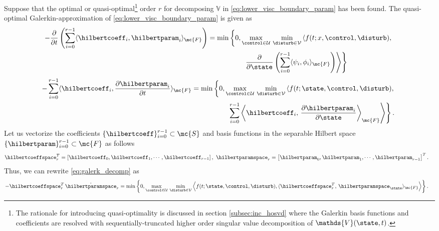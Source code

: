 Suppose that the optimal or quasi-optimal\footnote{The rationale for introducing quasi-optimality is discussed in section \ref{subsec:inc_hosvd} where the Galerkin basis functions and coefficients are resolved with sequentially-truncated higher order singular value decomposition of $\mathds{V}(\state, t)$.} order $r$ for decomposing $\mathds{V}$ in \eqref{eq:lower_visc_boundary_param} has been found.
%
The quasi-optimal Galerkin-approximation of \eqref{eq:lower_visc_boundary_param} is given as
%
	\begin{align}
		\begin{split}
		-\frac{\partial}{\partial t}\left(\sum_{i=0}^{r-1} \langle \hilbertcoeff_i,  \hilbertparam_i \rangle_{\mc{F}} \right) &= 
		\min \left\{0,  
			\max_{\control \in \mathcal{U}} \, \min_{\disturb \in \mathcal{V}} \left\langle f(t; x, \control, \disturb), \right. \right. \\
		 & \qquad \qquad \quad \left. \left. \dfrac{\partial }{\partial \state}\left(\sum_{i=0}^{r-1} \langle \psi_i, \phi_i\rangle_{\mc{F}} \right) \right\rangle \right\} 
		 \end{split}
		\end{align}
	\begin{align}
		\begin{split}
			-\sum_{i=0}^{r-1} \langle \hilbertcoeff_i, \dfrac{\partial \hilbertparam_i}{\partial t} \rangle_{\mc{F}}	&= \min \left\{0,  
			\max_{\control \in \mathcal{U}} \, \min_{\disturb \in \mathcal{V}} \left\langle f(t; \state, \control, \disturb), \right. \right. \\
			& \qquad \qquad \quad \left. \left. \sum_{i=0}^{r-1} \left\langle \hilbertcoeff_i, \, \dfrac{\partial \hilbertparam_i}{\partial \state} \right\rangle_{\mc{F}} \right\rangle \right\}.
		\end{split}
	\label{eq:galerk_decomp}
	\end{align}
%
Let us vectorize the coefficients $\{\hilbertcoeff\}_{i=0}^{r-1} \subset \mc{S}$ and basis functions in the separable Hilbert space $\{\hilbertparam\}_{i=0}^{r-1} \subset \mc{F}$ as follows 
	\begin{align}
		\hilbertcoeffspace_r^T &= \left[\hilbertcoeff_0, \hilbertcoeff_1, \cdots, \hilbertcoeff_{r-1}\right], \,\,
		\hilbertparamspace_r = \left[\hilbertparam_0, \hilbertparam_1, \cdots, \hilbertparam_{r-1}\right]^T.
	\end{align}
%
Thus, we can rewrite \eqref{eq:galerk_decomp} as 
	\begin{align}
		-\hilbertcoeffspace_r^T \, \dot{\hilbertparamspace}_r  &= \min \left\{0, \max_{\control \in \mathcal{U}} \, \min_{\disturb \in \mathcal{V}} \left\langle f(t; \state, \control, \disturb), \langle \hilbertcoeffspace_r^T, \, \hilbertparamspace_{\state}\rangle_{\mc{F}} \right\rangle \right\}. %
		\label{eq:galerk_opt}
	\end{align}
